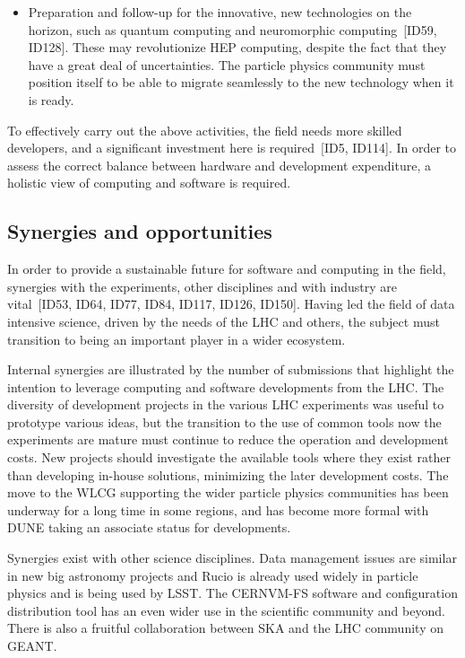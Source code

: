 \begin{itemize}
    
    \item Preparation and follow-up for the innovative, new technologies on the horizon, such as quantum computing and neuromorphic computing~[ID59, ID128].  These may revolutionize HEP computing, despite the fact that they have a great deal of uncertainties. The particle physics community must position itself to be able to migrate seamlessly to the new technology when it is ready.

\end{itemize}

To effectively carry out the above activities, the field needs more skilled developers, and a significant investment here is required~[ID5, ID114]. In order to assess the correct balance between hardware and development expenditure, a holistic view of computing and software is required.


\subsection{Synergies and opportunities}
In order to provide a sustainable future for software and computing in the field, synergies with the experiments, other disciplines and with industry are vital~[ID53, ID64, ID77, ID84, ID117, ID126, ID150]. Having led the field of data intensive science, driven by the needs of the LHC and others, the subject must transition to being an important player in a wider ecosystem.

Internal synergies are illustrated by the number of submissions that highlight the intention to leverage computing and software developments from the LHC. The diversity of development projects in the various LHC experiments was useful to prototype various ideas, but the transition to the use of common tools now the experiments are mature must continue to reduce the operation and development costs. New projects should investigate the available tools where they exist rather than developing in-house solutions, minimizing the later development costs. The move to the WLCG supporting the wider particle physics communities has been underway for a long time in some regions, and has become more formal with DUNE taking an associate status for developments. 

Synergies exist with other science disciplines. Data management issues are similar in new big astronomy projects and Rucio is already used widely in particle physics and is being used by LSST. The CERNVM-FS software and configuration distribution tool has an even wider use in the scientific community and beyond. There is also a fruitful collaboration between SKA and the LHC community on GEANT.

